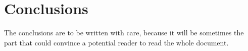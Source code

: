 \documentclass[11pt,a4paper,oneside,draft]{book}
\theoremstyle{plain}
\theoremstyle{definition}
\theoremstyle{remark}
\begin{document}
\chapter*{Conclusions}

The conclusions are to be written with care, because it will be sometimes the part that could convince a potential reader to read the whole document.

\appendix

\backmatter

\printindex %



\end{document}
